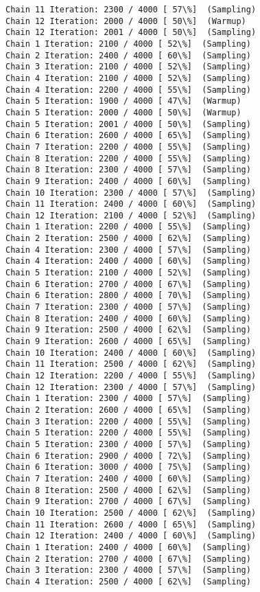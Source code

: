 \documentclass[11pt]{article}
\begin{document}
\begin{Verbatim}[commandchars=\\\{\}]
Chain 11 Iteration: 2300 / 4000 [ 57\%]  (Sampling)
Chain 12 Iteration: 2000 / 4000 [ 50\%]  (Warmup)
Chain 12 Iteration: 2001 / 4000 [ 50\%]  (Sampling)
Chain 1 Iteration: 2100 / 4000 [ 52\%]  (Sampling)
Chain 2 Iteration: 2400 / 4000 [ 60\%]  (Sampling)
Chain 3 Iteration: 2100 / 4000 [ 52\%]  (Sampling)
Chain 4 Iteration: 2100 / 4000 [ 52\%]  (Sampling)
Chain 4 Iteration: 2200 / 4000 [ 55\%]  (Sampling)
Chain 5 Iteration: 1900 / 4000 [ 47\%]  (Warmup)
Chain 5 Iteration: 2000 / 4000 [ 50\%]  (Warmup)
Chain 5 Iteration: 2001 / 4000 [ 50\%]  (Sampling)
Chain 6 Iteration: 2600 / 4000 [ 65\%]  (Sampling)
Chain 7 Iteration: 2200 / 4000 [ 55\%]  (Sampling)
Chain 8 Iteration: 2200 / 4000 [ 55\%]  (Sampling)
Chain 8 Iteration: 2300 / 4000 [ 57\%]  (Sampling)
Chain 9 Iteration: 2400 / 4000 [ 60\%]  (Sampling)
Chain 10 Iteration: 2300 / 4000 [ 57\%]  (Sampling)
Chain 11 Iteration: 2400 / 4000 [ 60\%]  (Sampling)
Chain 12 Iteration: 2100 / 4000 [ 52\%]  (Sampling)
Chain 1 Iteration: 2200 / 4000 [ 55\%]  (Sampling)
Chain 2 Iteration: 2500 / 4000 [ 62\%]  (Sampling)
Chain 4 Iteration: 2300 / 4000 [ 57\%]  (Sampling)
Chain 4 Iteration: 2400 / 4000 [ 60\%]  (Sampling)
Chain 5 Iteration: 2100 / 4000 [ 52\%]  (Sampling)
Chain 6 Iteration: 2700 / 4000 [ 67\%]  (Sampling)
Chain 6 Iteration: 2800 / 4000 [ 70\%]  (Sampling)
Chain 7 Iteration: 2300 / 4000 [ 57\%]  (Sampling)
Chain 8 Iteration: 2400 / 4000 [ 60\%]  (Sampling)
Chain 9 Iteration: 2500 / 4000 [ 62\%]  (Sampling)
Chain 9 Iteration: 2600 / 4000 [ 65\%]  (Sampling)
Chain 10 Iteration: 2400 / 4000 [ 60\%]  (Sampling)
Chain 11 Iteration: 2500 / 4000 [ 62\%]  (Sampling)
Chain 12 Iteration: 2200 / 4000 [ 55\%]  (Sampling)
Chain 12 Iteration: 2300 / 4000 [ 57\%]  (Sampling)
Chain 1 Iteration: 2300 / 4000 [ 57\%]  (Sampling)
Chain 2 Iteration: 2600 / 4000 [ 65\%]  (Sampling)
Chain 3 Iteration: 2200 / 4000 [ 55\%]  (Sampling)
Chain 5 Iteration: 2200 / 4000 [ 55\%]  (Sampling)
Chain 5 Iteration: 2300 / 4000 [ 57\%]  (Sampling)
Chain 6 Iteration: 2900 / 4000 [ 72\%]  (Sampling)
Chain 6 Iteration: 3000 / 4000 [ 75\%]  (Sampling)
Chain 7 Iteration: 2400 / 4000 [ 60\%]  (Sampling)
Chain 8 Iteration: 2500 / 4000 [ 62\%]  (Sampling)
Chain 9 Iteration: 2700 / 4000 [ 67\%]  (Sampling)
Chain 10 Iteration: 2500 / 4000 [ 62\%]  (Sampling)
Chain 11 Iteration: 2600 / 4000 [ 65\%]  (Sampling)
Chain 12 Iteration: 2400 / 4000 [ 60\%]  (Sampling)
Chain 1 Iteration: 2400 / 4000 [ 60\%]  (Sampling)
Chain 2 Iteration: 2700 / 4000 [ 67\%]  (Sampling)
Chain 3 Iteration: 2300 / 4000 [ 57\%]  (Sampling)
Chain 4 Iteration: 2500 / 4000 [ 62\%]  (Sampling)

\end{Verbatim}
\end{document}
